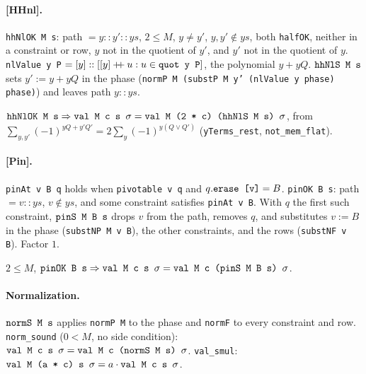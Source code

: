 \paragraph{[HHnl].} \textnormal{\texttt{hhNlOK M s}}: path $= y::y'::ys$, $2\le M$, $y\ne y'$, $y,y'\notin ys$,
both \textnormal{\texttt{halfOK}}, neither in a constraint or row, $y$ not in the quotient of $y'$, and $y'$ not
in the quotient of $y$. \textnormal{\texttt{nlValue y P}} $= [y] :: [[y]\mathbin{+\!\!+}u : u\in\textnormal{\texttt{quot y P}}]$, the
polynomial $y+yQ$. $\textnormal{\texttt{hhNlS M s}}$ sets $y' := y+yQ$ in the phase
(\textnormal{\texttt{normP M (\allowbreak{}substP M y' (\allowbreak{}nlValue y phase) phase)}}) and leaves path $y::ys$.
\begin{theorem}
$\textnormal{\texttt{hhNlOK M s}}\Rightarrow\textnormal{\texttt{val M c s \ensuremath{\sigma}}} = \textnormal{\texttt{val M (\allowbreak{}2 * c) (\allowbreak{}hhNlS M s) \ensuremath{\sigma}}}$, from
$\sum_{y,y'}(-1)^{yQ+y'Q'} = 2\sum_y(-1)^{y(Q\vee Q')}$ (\textnormal{\texttt{yTerms\_\allowbreak{}rest}}, \textnormal{\texttt{not\_\allowbreak{}mem\_\allowbreak{}flat}}).
\end{theorem}

\paragraph{[Pin].} \textnormal{\texttt{pinAt v B q}} holds when \textnormal{\texttt{pivotable v q}} and $q.\textnormal{\texttt{erase [v]}} = B$.
\textnormal{\texttt{pinOK B s}}: path $= v :: ys$, $v\notin ys$, and some constraint satisfies \textnormal{\texttt{pinAt v B}}.
With $q$ the first such constraint, $\textnormal{\texttt{pinS M B s}}$ drops $v$ from the path, removes $q$, and
substitutes $v:=B$ in the phase (\textnormal{\texttt{substNP M v B}}), the other constraints, and the rows
(\textnormal{\texttt{substNF v B}}). Factor $1$.
\begin{theorem}
$2\le M$, $\textnormal{\texttt{pinOK B s}}\Rightarrow\textnormal{\texttt{val M c s \ensuremath{\sigma}}} = \textnormal{\texttt{val M c (\allowbreak{}pinS M B s) \ensuremath{\sigma}}}$.
\end{theorem}

\paragraph{Normalization.} $\textnormal{\texttt{normS M s}}$ applies \textnormal{\texttt{normP M}} to the phase and \textnormal{\texttt{normF}}
to every constraint and row. \textnormal{\texttt{norm\_\allowbreak{}sound}} ($0<M$, no side condition):
$\textnormal{\texttt{val M c s \ensuremath{\sigma}}} = \textnormal{\texttt{val M c (\allowbreak{}normS M s) \ensuremath{\sigma}}}$. \textnormal{\texttt{val\_\allowbreak{}smul}}:
$\textnormal{\texttt{val M (\allowbreak{}a * c) s \ensuremath{\sigma}}} = a\cdot\textnormal{\texttt{val M c s \ensuremath{\sigma}}}$.

